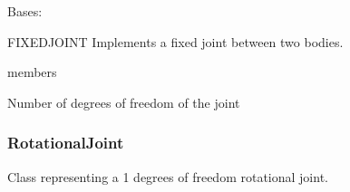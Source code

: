 \documentclass[letterpaper,10pt,english]{sphinxmanual}
\begin{document}
\begin{fulllineitems}
\label{\detokenize{fixedjoint:FixedJoint}}
\pysigstartsignatures
{}
\pysigstopsignatures
\sphinxAtStartPar
Bases: {\hyperref[\detokenize{joint:Joint}]{}}

\sphinxAtStartPar
FIXEDJOINT Implements a fixed joint between two bodies.

\begin{sphinxuseclass}{members}\begin{description}

\begin{fulllineitems}
\label{\detokenize{fixedjoint:FixedJoint.n}}
\pysigstartsignatures
{}
\pysigstopsignatures
\sphinxAtStartPar
Number of degrees of freedom of the joint

\end{fulllineitems}


\end{description}

\end{sphinxuseclass}
\end{fulllineitems}


\sphinxstepscope


\subsubsection{RotationalJoint}
\label{\detokenize{rotationaljoint:rotationaljoint}}\label{\detokenize{rotationaljoint::doc}}\label{\detokenize{rotationaljoint:module-classes}}
\sphinxAtStartPar
Class representing a 1 degrees of freedom rotational joint.
\end{document}
